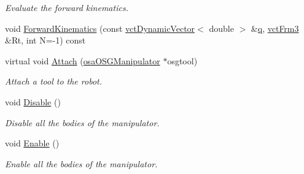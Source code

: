 \begin{DoxyCompactItemize}
\begin{DoxyCompactList}\small\item\em Evaluate the forward kinematics. \end{DoxyCompactList}\item 
void \hyperlink{classosa_o_d_e_manipulator_ae5c60de970e2f7fca3cdc8cbb816084e}{Forward\+Kinematics} (const \hyperlink{classvct_dynamic_vector}{vct\+Dynamic\+Vector}$<$ double $>$ \&\hyperlink{classosa_o_s_g_manipulator_a834ce7263dace4d925133753522abaa3}{q}, \hyperlink{vct_transformation_types_8h_a81feda0a02c2d1bc26e5553f409fed20}{vct\+Frm3} \&Rt, int N=-\/1) const 
\item 
virtual void \hyperlink{classosa_o_d_e_manipulator_a6864d11bf58688c76014734a28c0640f}{Attach} (\hyperlink{classosa_o_s_g_manipulator}{osa\+O\+S\+G\+Manipulator} $\ast$osgtool)
\begin{DoxyCompactList}\small\item\em Attach a tool to the robot. \end{DoxyCompactList}\item 
void \hyperlink{classosa_o_d_e_manipulator_aa285ecf833ff8dd1c4cf145be2b160be}{Disable} ()
\begin{DoxyCompactList}\small\item\em Disable all the bodies of the manipulator. \end{DoxyCompactList}\item 
void \hyperlink{classosa_o_d_e_manipulator_a15be7f15bc5363ed05771128b77954bc}{Enable} ()
\begin{DoxyCompactList}\small\item\em Enable all the bodies of the manipulator. \end{DoxyCompactList}\end{DoxyCompactItemize}
